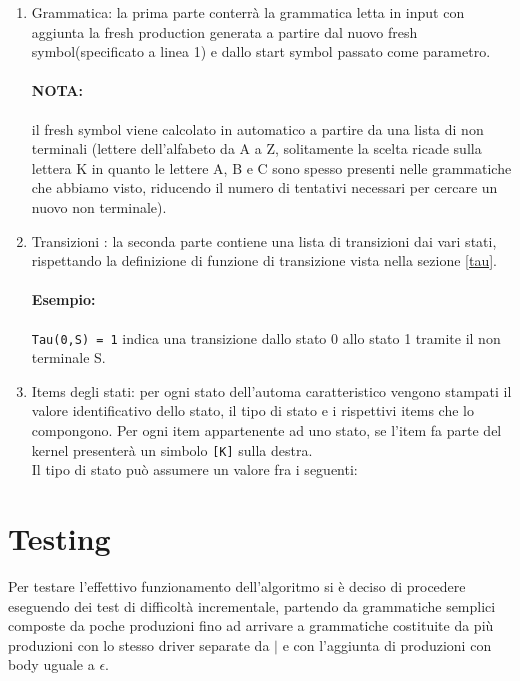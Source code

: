\documentclass[12pt]{article}
\begin{document}
\begin{enumerate}
\item Grammatica: la prima parte conterrà la grammatica letta in input con aggiunta la fresh production generata a partire dal nuovo fresh symbol(specificato a linea 1) e dallo start symbol passato come parametro.

\paragraph{NOTA:}il fresh symbol viene calcolato in automatico a partire da una lista di non terminali (lettere dell'alfabeto da A a Z, solitamente la scelta ricade sulla lettera K in quanto le lettere A, B e C sono spesso presenti nelle grammatiche che abbiamo visto, riducendo il numero di tentativi necessari per cercare un nuovo non terminale).

\item Transizioni : la seconda parte contiene una lista di transizioni dai vari stati, rispettando la definizione di funzione di transizione vista nella sezione \ref{tau}.
\paragraph{Esempio: } \texttt{Tau(0,S) = 1} indica una transizione dallo stato 0 allo stato 1 tramite il non terminale S.

\item Items degli stati: per ogni stato dell'automa caratteristico vengono stampati il valore identificativo dello stato, il tipo di stato e i rispettivi items che lo compongono. Per ogni item appartenente ad uno stato, se l'item fa parte del kernel presenterà un simbolo \texttt{[K]} sulla destra.\\


Il tipo di stato può assumere un valore fra i seguenti:

\end{enumerate}


\section{Testing}
Per testare l'effettivo funzionamento dell'algoritmo si è deciso di procedere eseguendo dei test di difficoltà incrementale, partendo da grammatiche semplici composte da poche produzioni fino ad arrivare a grammatiche costituite da più produzioni con lo stesso driver separate da $\mid$ e con l'aggiunta di produzioni con body uguale a $\epsilon$.\\
\end{document}
